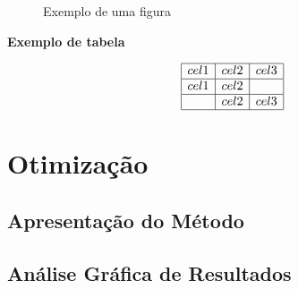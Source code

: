\documentclass[a4paper,12pt]{report}
\begin{document}
\begin{figure}[htbp]
   \centering
   \caption{Exemplo de uma figura}
\end{figure}

\textbf{Exemplo de tabela}


\[
  \begin{array}{|c|c|c|}
    \hline
    cel1 & cel2 & cel3 \\ \hline
    cel1 & cel2 &      \\ \hline
         & cel2 & cel3 \\ \hline
  \end{array}
\]



\chapter{Otimização}

\section{Apresentação do Método}

\section{Análise Gráfica de Resultados}
\end{document}
